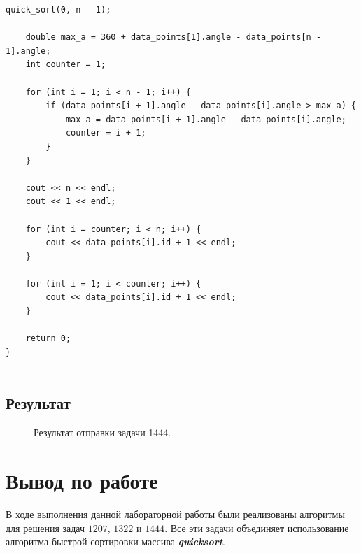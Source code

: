 \documentclass[a5paper, 10pt]{article}
\theoremstyle{definition}
\theoremstyle{plain}
\theoremstyle{remark}
\begin{document}
\begin{center}
\begin{lstlisting}[label=some-code,caption={Исходный код для 1444}]
    quick_sort(0, n - 1);

    double max_a = 360 + data_points[1].angle - data_points[n - 1].angle;
    int counter = 1;

    for (int i = 1; i < n - 1; i++) {
        if (data_points[i + 1].angle - data_points[i].angle > max_a) {
            max_a = data_points[i + 1].angle - data_points[i].angle;
            counter = i + 1;
        }
    }

    cout << n << endl;
    cout << 1 << endl;

    for (int i = counter; i < n; i++) {
        cout << data_points[i].id + 1 << endl;
    }

    for (int i = 1; i < counter; i++) {
        cout << data_points[i].id + 1 << endl;
    }

    return 0;
}


\end{lstlisting}
\end{center}

\subsection{Результат}
\begin{figure}[h]
\caption{Результат отправки задачи 1444.}
\end{figure}


\newpage



\newpage
\section{Вывод по работе}
В ходе выполнения данной лабораторной работы были реализованы алгоритмы для решения задач $1207$, $1322$ и $1444$. Все эти задачи объединяет использование алгоритма быстрой сортировки массива \textbf{\textit{quicksort}}.
\end{document}
